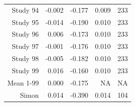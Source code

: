 \begin{table}[!h]
{\begin{tabular}[t]{rrrrr}
\hspace{1em}Study 94 & -0.002 & -0.177 & 0.009 & 233\\
\hspace{1em}Study 95 & -0.014 & -0.190 & 0.010 & 233\\
\hspace{1em}Study 96 & 0.006 & -0.173 & 0.010 & 233\\
\hspace{1em}Study 97 & -0.001 & -0.176 & 0.010 & 233\\
\hspace{1em}Study 98 & -0.005 & -0.182 & 0.010 & 233\\
\hspace{1em}Study 99 & 0.016 & -0.160 & 0.010 & 233\\
\hspace{1em}Mean 1-99 & 0.000 & -0.175 & NA & NA\\
\hspace{1em}Simon & 0.014 & -0.390 & 0.014 & 104\\
\bottomrule
\end{tabular}}
\end{table}
